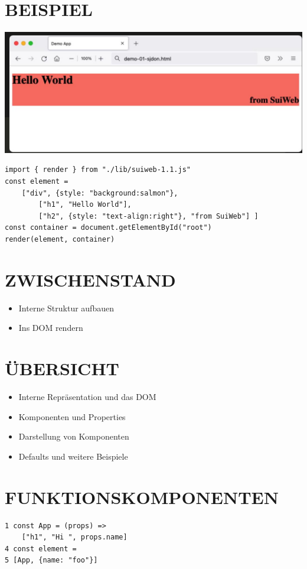 \documentclass[10pt]{article}
\begin{document}
\section*{BEISPIEL}
\begin{center}
\includegraphics[max width=\textwidth]{2025_01_02_254b5e4c52d090c313e1g-18}
\end{center}

\begin{verbatim}
import { render } from "./lib/suiweb-1.1.js"
const element =
    ["div", {style: "background:salmon"},
        ["h1", "Hello World"],
        ["h2", {style: "text-align:right"}, "from SuiWeb"] ]
const container = document.getElementById("root")
render(element, container)
\end{verbatim}

\section*{ZWISCHENSTAND}
\begin{itemize}
  \item Interne Struktur aufbauen
  \item Ins DOM rendern
\end{itemize}



\section*{ÜBERSICHT}
\begin{itemize}
  \item Interne Repräsentation und das DOM
  \item Komponenten und Properties
  \item Darstellung von Komponenten
  \item Defaults und weitere Beispiele
\end{itemize}

\section*{FUNKTIONSKOMPONENTEN}
\begin{verbatim}
1 const App = (props) =>
    ["h1", "Hi ", props.name]
4 const element =
5 [App, {name: "foo"}]
\end{verbatim}
\end{document}
